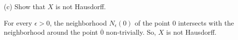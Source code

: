 \documentclass[12pt]{article}
\begin{document}
\begin{enumerate}
\begin{enumerate}
    \item[(c)] Show that $X$ is not Hausdorff.
        \begin{mybox}

            For every $\epsilon>0$, the neighborhood
            $N_\epsilon(0)$
            of the point 0 intersects with the neighborhood
            around the point $\overline{0}$
            non-trivially. So, $X$ is
            not Hausdorff.
        \end{mybox}

\end{enumerate}

\end{enumerate}
\end{document}

